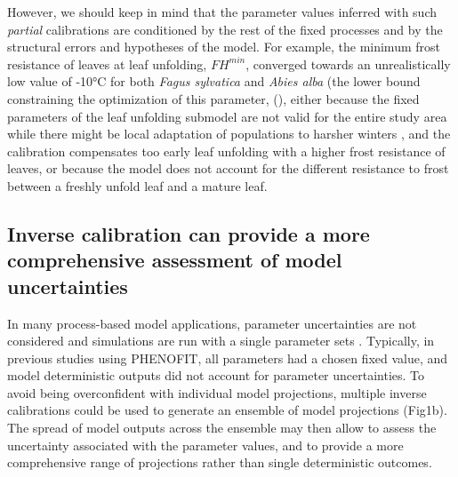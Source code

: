 \documentclass[letterpaper,8pt]{extarticle}  %
\begin{document}
\begin{doublespacing}
\begin{linenumbers}
However, we should keep in mind that the parameter values inferred with such \emph{partial} calibrations are conditioned by the rest of the fixed processes and by the structural errors and hypotheses of the model. For example, the minimum frost resistance of leaves at leaf unfolding, ${FH}^{min}$, converged towards an unrealistically low value of -10°C for both \emph{Fagus sylvatica} and \emph{Abies alba} (the lower bound constraining the optimization of this parameter, (), either because the fixed parameters of the leaf unfolding submodel are not valid for the entire study area while there might be local adaptation of populations to harsher winters \citep{Kreyling2014}, and the calibration compensates too early leaf unfolding with a higher frost resistance of leaves, or because the model does not account for the different resistance to frost between a freshly unfold leaf and a mature leaf.  


\subsection{Inverse calibration can provide a more comprehensive assessment of model uncertainties}

In many process-based model applications, parameter uncertainties are not considered and simulations are run with a single parameter sets \citep{Niu2014, Lobell2010}. Typically, in previous studies using PHENOFIT, all parameters had a chosen fixed value, and model deterministic outputs did not account for parameter uncertainties. To avoid being overconfident with individual model projections, multiple inverse calibrations could be used to generate an ensemble of model projections (Fig1b). The spread of model outputs across the ensemble may then allow to assess the uncertainty associated with the parameter values, and to provide a more comprehensive range of projections rather than single deterministic outcomes.


\end{linenumbers}
\end{doublespacing}
\end{document}

